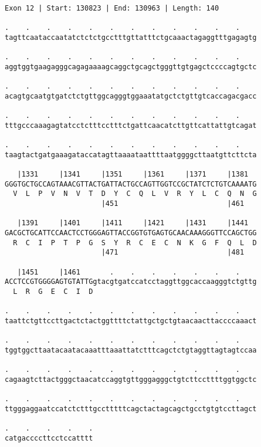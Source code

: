 \documentclass{article}
\begin{document}
\newpage
\begin{Verbatim}
Exon 12 | Start: 130823 | End: 130963 | Length: 140
 
.    .    .    .    .    .    .    .    .    .    .    .    
tagttcaataccaatatctctctgcctttgttatttctgcaaactagaggtttgagagtg
  
.    .    .    .    .    .    .    .    .    .    .    .    
aggtggtgaagagggcagagaaaagcaggctgcagctgggttgtgagctccccagtgctc
  
.    .    .    .    .    .    .    .    .    .    .    .    
acagtgcaatgtgatctctgttggcagggtggaaatatgctctgttgtcaccagacgacc
  
.    .    .    .    .    .    .    .    .    .    .    .    
tttgcccaaagagtatcctctttcctttctgattcaacatcttgttcattattgtcagat
  
.    .    .    .    .    .    .    .    .    .    .    .    
taagtactgatgaaagataccatagttaaaataattttaatggggcttaatgttcttcta
  
   |1331     |1341     |1351     |1361     |1371     |1381  
GGGTGCTGCCAGTAAACGTTACTGATTACTGCCAGTTGGTCCGCTATCTCTGTCAAAATG
  V  L  P  V  N  V  T  D  Y  C  Q  L  V  R  Y  L  C  Q  N  G
                       |451                          |461   
  
   |1391     |1401     |1411     |1421     |1431     |1441  
GACGCTGCATTCCAACTCCTGGGAGTTACCGGTGTGAGTGCAACAAAGGGTTCCAGCTGG
  R  C  I  P  T  P  G  S  Y  R  C  E  C  N  K  G  F  Q  L  D
                       |471                          |481   
  
   |1451     |1461       .    .    .    .    .    .    .    
ACCTCCGTGGGGAGTGTATTGgtacgtgatccatcctaggttggcaccaagggtctgttg
  L  R  G  E  C  I  D                                       
  
.    .    .    .    .    .    .    .    .    .    .    .    
taattctgttccttgactctactggttttctattgctgctgtaacaacttaccccaaact
  
.    .    .    .    .    .    .    .    .    .    .    .    
tggtggcttaatacaatacaaatttaaattatctttcagctctgtaggttagtagtccaa
  
.    .    .    .    .    .    .    .    .    .    .    .    
cagaagtcttactgggctaacatccaggtgttgggagggctgtcttccttttggtggctc
  
.    .    .    .    .    .    .    .    .    .    .    .    
ttgggaggaatccatctctttgcctttttcagctactagcagctgcctgtgtccttagct
  
.    .    .    .    .
catgaccccttcctccatttt
\end{Verbatim}
\newpage
\end{document}

